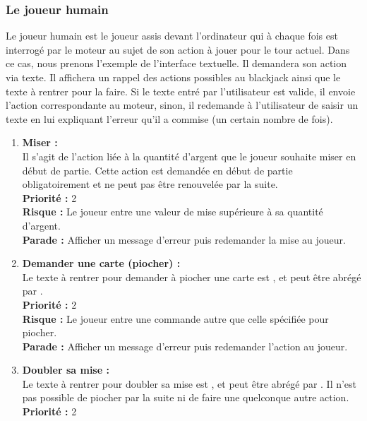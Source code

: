 \subsubsection{Le joueur humain}
\label{sec:human}

Le joueur humain est le joueur assis devant l'ordinateur qui à chaque fois est interrogé par le moteur au sujet de son action à jouer pour le tour actuel. Dans ce cas, nous prenons l'exemple de l'interface textuelle. Il demandera son action via texte. Il affichera un rappel des actions possibles au blackjack ainsi que le texte à rentrer pour la faire. Si le texte entré par l'utilisateur est valide, il envoie l'action correspondante au moteur, sinon, il redemande à l'utilisateur de saisir un texte en lui expliquant l'erreur qu'il a commise (un certain nombre de fois). 
\begin{enumerate}
    \item \textbf {Miser :} \\
    Il s'agit de l'action liée à la quantité d'argent que le joueur souhaite miser en début de partie. Cette action est demandée en début de partie obligatoirement et ne peut pas être renouvelée par la suite. \\
    \textbf{Priorité :} 2 \\
    \textbf{Risque :} Le joueur entre une valeur de mise supérieure à sa quantité d'argent. \\
    \textbf{Parade :} Afficher un message d'erreur puis redemander la mise au joueur.\\
    \item \textbf {Demander une carte (piocher) :} \\
    Le texte à rentrer pour demander à piocher une carte est , et peut être abrégé par . \\
    \textbf{Priorité :} 2 \\
    \textbf{Risque :} Le joueur entre une commande autre que celle spécifiée pour piocher. \\
    \textbf{Parade :} Afficher un message d'erreur puis redemander l'action au joueur.\\
    \item \textbf {Doubler sa mise :} \\
    Le texte à rentrer pour doubler sa mise est , et peut être abrégé par .
    Il n'est pas possible de piocher par la suite ni de faire une quelconque autre action. \\
    \textbf{Priorité :} 2 \\

\end{enumerate}
